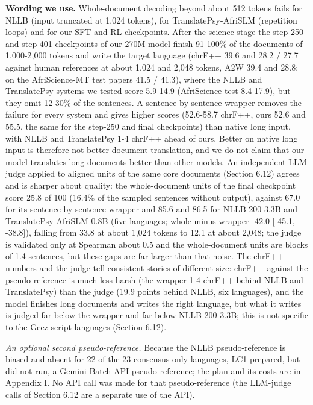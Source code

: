 \textbf{Wording we use.} Whole-document decoding beyond about 512 tokens fails for NLLB (input truncated at 1,024 tokens), for TranslatePsy-AfriSLM (repetition loops) and for our SFT and RL checkpoints. After the science stage the step-250 and step-401 checkpoints of our 270M model finish 91-100\% of the documents of 1,000-2,000 tokens and write the target language (chrF++ 39.6 and 28.2 / 27.7 against human references at about 1,024 and 2,048 tokens, A2W 39.4 and 28.8; on the AfriScience-MT test papers 41.5 / 41.3), where the NLLB and TranslatePsy systems we tested score 5.9-14.9 (AfriScience test 8.4-17.9), but they omit 12-30\% of the sentences. A sentence-by-sentence wrapper removes the failure for every system and gives higher scores (52.6-58.7 chrF++, ours 52.6 and 55.5, the same for the step-250 and final checkpoints) than native long input, with NLLB and TranslatePsy 1-4 chrF++ ahead of ours. Better on native long input is therefore not better document translation, and we do not claim that our model translates long documents better than other models. An independent LLM judge applied to aligned units of the same core documents (Section 6.12) agrees and is sharper about quality: the whole-document units of the final checkpoint score 25.8 of 100 (16.4\% of the sampled sentences without output), against 67.0 for its sentence-by-sentence wrapper and 85.6 and 86.5 for NLLB-200 3.3B and TranslatePsy-AfriSLM-0.8B (five languages; whole minus wrapper -42.0 {[}-45.1, -38.8{]}), falling from 33.8 at about 1,024 tokens to 12.1 at about 2,048; the judge is validated only at Spearman about 0.5 and the whole-document units are blocks of 1.4 sentences, but these gaps are far larger than that noise. The chrF++ numbers and the judge tell consistent stories of different size: chrF++ against the pseudo-reference is much less harsh (the wrapper 1-4 chrF++ behind NLLB and TranslatePsy) than the judge (19.9 points behind NLLB, six languages), and the model finishes long documents and writes the right language, but what it writes is judged far below the wrapper and far below NLLB-200 3.3B; this is not specific to the Ge\textquotesingle ez-script languages (Section 6.12).

\emph{An optional second pseudo-reference.} Because the NLLB pseudo-reference is biased and absent for 22 of the 23 consensus-only languages, LC1 prepared, but did not run, a Gemini Batch-API pseudo-reference; the plan and its costs are in Appendix I. No API call was made for that pseudo-reference (the LLM-judge calls of Section 6.12 are a separate use of the API).

